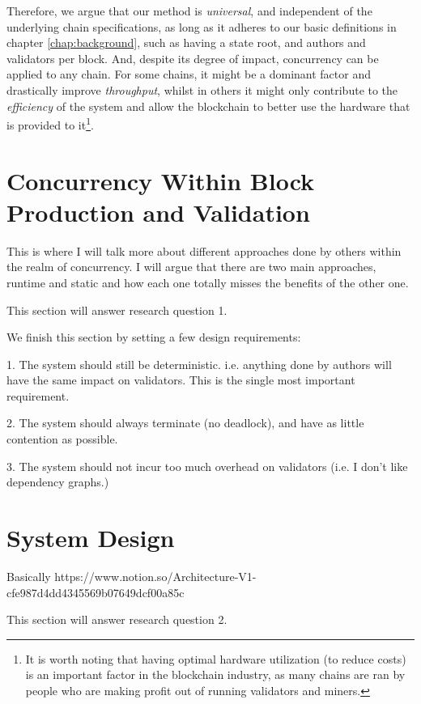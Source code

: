 Therefore, we argue that our method is \textit{universal}, and independent of the underlying chain
specifications, as long as it adheres to our basic definitions in chapter \ref{chap:background},
such as having a state root, and authors and validators per block. And, despite its degree of
impact, concurrency can be applied to any chain. For some chains, it might be a dominant factor and
drastically improve \textit{throughput}, whilst in others it might only contribute to the
\textit{efficiency} of the system and allow the blockchain to better use the hardware that is
provided to it\footnote{It is worth noting that having optimal hardware utilization (to reduce
costs) is an important factor in the blockchain industry, as many chains are ran by people who are
making profit out of running validators and miners.}.


\section{Concurrency Within Block Production and Validation}

This is where I will talk more about different approaches done by others within the realm of
concurrency. I will argue that there are two main approaches, runtime and static and how each one
totally misses the benefits of the other one.

This section will answer research question 1.

We finish this section by setting a few design requirements:

1. The system should still be deterministic. i.e. anything done by authors will have the same impact
on validators. This is the single most important requirement.

2. The system should always terminate (no deadlock), and have as little contention as possible.

3. The system should not incur too much overhead on validators (i.e. I don't like dependency
graphs.)

\section{System Design} \label{chap_desgin:sec:design}

Basically https://www.notion.so/Architecture-V1-cfe987d4dd4345569b07649dcf00a85c

This section will answer research question 2.
